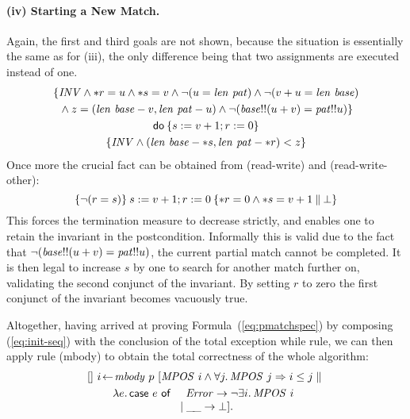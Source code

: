 \paragraph{(iv) Starting a New Match.}
Again, the first and third goals are not shown, because the situation is
essentially the same as for (iii), the only difference being that two
assignments are executed instead of one.
\begin{gather}
\label{eq:monkey4-2}\nonumber
\{\mathit{INV} \land {\ast r} = u \land {\ast s} = v \land \lnot(u = \mathit{len}~\mathit{pat}) \land \lnot (v+u =
\mathit{len}~\mathit{base}) \\\nonumber
{} \land z = (\mathit{len}~\mathit{base} - v, \mathit{len}~\mathit{pat} - u) \land
   \lnot(\mathit{base}!!(u+v) = \mathit{pat}!!u)\}\\
{\mathsf{do}\: \{s := v + 1; r := 0\}}\\\nonumber
\{\mathit{INV} \land (\mathit{len}~\mathit{base} - {\ast s}, \mathit{len}~\mathit{pat} - {\ast r}) < z\}
\end{gather}
Once more the crucial fact can be obtained from (read-write) and
(read-write-other):
\begin{equation}
\label{eq:rd-wrt-carry2}
\{\lnot(r = s)\}\:s:= v+1; r := 0\:\{{\ast r} = 0 \land {\ast s} = v+1\:\|\:\bot\}
\end{equation}
This forces the termination measure to decrease strictly, and enables one to
retain the invariant in the postcondition. Informally this is valid due to the
fact that $\lnot(\mathit{base}!!(u+v) = \mathit{pat}!!u)$, \IE the current partial match
cannot be completed. It is then legal to increase $s$ by one to search for
another match further on, validating the second conjunct of the invariant. By
setting $r$ to zero the first conjunct of the invariant becomes vacuously true.



Altogether, having arrived at proving Formula~(\ref{eq:pmatchspec}) by
composing (\ref{eq:init-seq}) with the conclusion of the total exception
while rule, we can then apply rule (mbody) to obtain the total
correctness of the whole algorithm:
\begin{multline}
\label{eq:pmmbody-spec}
[]~ i \leteq \mbody~p ~[\op{MPOS}\ i \land
    \forall j.\, \op{MPOS}\ j\Rightarrow i\leq j \parallel {} \\ 
\lambda e.\,\Case\ e\ \Of\ 
   \begin{array}[t]{l}
    \hspace{0.5em}\op{Error} \to \lnot \exists i.\, \op{MPOS}\ i \\
    \mid \Arg \to\bot].
   \end{array}
\end{multline}





